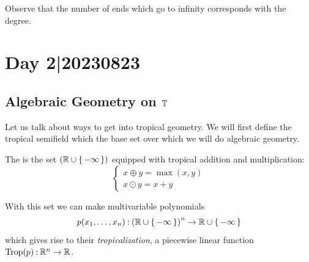 \documentclass[12pt]{memoir}
\DeclareMathOperator{\Trop}{Trop}
\begin{document}
Observe that the number of ends which go to infinity corresponds with the degree. 

\section{Day 2|20230823}
\subsection{Algebraic Geometry on $\mathbb{T}$}
Let us talk about ways to get into tropical geometry. We will first define the tropical semifield which the base set over which we will do algebraic geometry.

\begin{Def}
    The  is the set $(\mathbb{R}\cup\{\,-\infty\,\})$ equipped with tropical addition and multiplication:
    $$
    \begin{cases}
        x\oplus y=\max(x,y)\\
        x\odot y=x+y
    \end{cases}
    $$
\end{Def}

With this set we can make multivariable polynomials 
$$p(x_1,\dots,x_n)\mathbin{:}\left(\mathbb{R}\cup\{\,-\infty\,\}\right)^n\to\mathbb{R}\cup\{\,-\infty\,\}$$
which gives rise to their \emph{tropicalization}, a piecewise linear function $\Trop(p)\:\bR^n\to\bR$.
\end{document}
